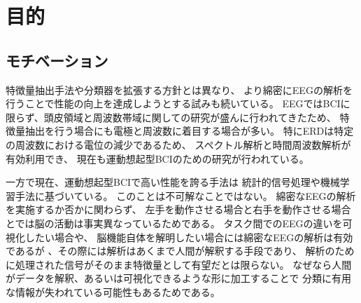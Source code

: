 \section{\mc 目的}
\subsection{\mc モチベーション}
特徴量抽出手法や分類器を拡張する方針とは異なり、
より綿密にEEGの解析を行うことで性能の向上を達成しようとする試みも続いている\cite{脳波解析BCI,脳波分析BCI,ERSBCI}。
EEGではBCIに限らず、頭皮領域と周波数帯域に関しての研究が盛んに行われてきたため、
特徴量抽出を行う場合にも電極と周波数に着目する場合が多い。
特にERDは特定の周波数における電位の減少であるため、
スペクトル解析と時間周波数解析が有効利用でき、
現在も運動想起型BCIのための研究が行われている\cite{時間周波数解析の比較}。

一方で現在、運動想起型BCIで高い性能を誇る手法は
統計的信号処理や機械学習手法に基づいている。
このことは不可解なことではない。
綿密なEEGの解析を実施するか否かに関わらず、
左手を動作させる場合と右手を動作させる場合とでは脳の活動は事実異なっているためである。
タスク間でのEEGの違いを可視化したい場合や、
脳機能自体を解明したい場合には綿密なEEGの解析は有効であるが
、その際には解析はあくまで人間が解釈する手段であり、
解析のために処理された信号がそのまま特徴量として有望だとは限らない。
なぜなら人間がデータを解釈、あるいは可視化できるような形に加工することで
分類に有用な情報が失われている可能性もあるためである。

